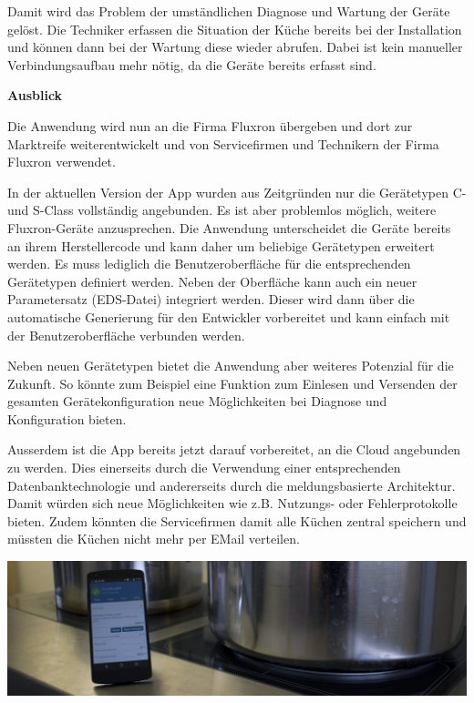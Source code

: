 Damit wird das Problem der umständlichen Diagnose und Wartung der Geräte gelöst. Die Techniker erfassen die Situation der Küche bereits bei der Installation und können dann bei der Wartung diese wieder abrufen. Dabei ist kein manueller Verbindungsaufbau mehr nötig, da die Geräte bereits erfasst sind.

\pagebreak

\textbf{Ausblick}

Die Anwendung wird nun an die Firma Fluxron übergeben und dort zur Marktreife weiterentwickelt und von Servicefirmen und Technikern der Firma Fluxron verwendet.

In der aktuellen Version der App wurden aus Zeitgründen nur die Gerätetypen C- und S-Class vollständig angebunden. Es ist aber problemlos möglich, weitere Fluxron-Geräte anzusprechen. Die Anwendung unterscheidet die Geräte bereits an ihrem Herstellercode und kann daher um beliebige Gerätetypen erweitert werden. Es muss lediglich die Benutzeroberfläche für die entsprechenden Gerätetypen definiert werden. Neben der Oberfläche kann auch ein neuer Parametersatz (EDS-Datei) integriert werden. Dieser wird dann über die automatische Generierung für den Entwickler vorbereitet und kann einfach mit der Benutzeroberfläche verbunden werden.

Neben neuen Gerätetypen bietet die Anwendung aber weiteres Potenzial für die Zukunft. So könnte zum Beispiel eine Funktion zum Einlesen und Versenden der gesamten Gerätekonfiguration neue Möglichkeiten bei Diagnose und Konfiguration bieten.

Ausserdem ist die App bereits jetzt darauf vorbereitet, an die Cloud angebunden zu werden. Dies einerseits durch die Verwendung einer entsprechenden Datenbanktechnologie und andererseits durch die meldungsbasierte Architektur. Damit würden sich neue Möglichkeiten wie z.B. Nutzungs- oder Fehlerprotokolle bieten. Zudem könnten die Servicefirmen damit alle Küchen zentral speichern und müssten die Küchen nicht mehr per EMail verteilen.

\vspace{1.4cm}

\includegraphics[trim={0 0 36 0},clip]{start/img/img_7670}